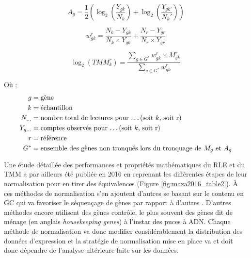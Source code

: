 \begin{equation}\label{avalue}
    A_g = \frac{1}{2} \left(\log_{2} \left(\frac{Y_{gk}}{N_k} \right) + \log_2 \left(\frac{Y_{gk'}}{N_k'}\right)\right)
\end{equation}

\begin{equation}\label{weightedmean}
    w^r_{gk} = \frac{N_k - Y_{gk}}{N_k \times Y_{gk}} + \frac{N_r - Y_{gr}}{N_r \times Y_{gr}}
\end{equation}

\begin{equation}\label{normtmmfactor}
    \log_2{} (TMM^r_k) = \frac{\sum_{g \in G^*} w^r_{gk} \times M^r_{gk}}{\sum_{g \in G^*} w^r_{gk}}
\end{equation}

Où :
\begin{align*}
    g & = \text{gène} \\
    k & = \text{échantillon} \\
    N_{\dots} & = \text{nombre total de lectures pour \dots (soit }k \text{, soit r)} \\
    Y_{g\dots} & = \text{comptes observés pour \dots (soit }k \text{, soit r)} \\
    r & = \text{référence} \\
    G^* & = \text{ensemble des gènes non tronqués lors du tronquage de } M_g \text{ et } A_g
\end{align*}


Une étude détaillée des performances et propriétés mathématiques du \acrshort{RLE} et du \acrshort{TMM} a par ailleurs été publiée en 2016 en reprenant les différentes étapes de leur normalisation pour en tirer des équivalences \cite{Maza2016} (Figure \ref{fig:maza2016_table2}). À ces méthodes de normalisation s'en ajoutent d'autres se basant sur le contenu en GC qui va favoriser le séquençage de gènes par rapport à d'autres \cite{Filloux2014Dec}. D'autres méthodes encore utilisent des gènes contrôle, le plus souvent des gènes dit de ménage (en anglais \textit{housekeeping genes}) \cite{Zhou2017Sep} à l'instar des puces à \acrshort{ADN}. Chaque méthode de normalisation va donc modifier considérablement la distribution des données d'expression et la stratégie de normalisation mise en place va et doit donc dépendre de l'analyse ultérieure faite sur les données. 


